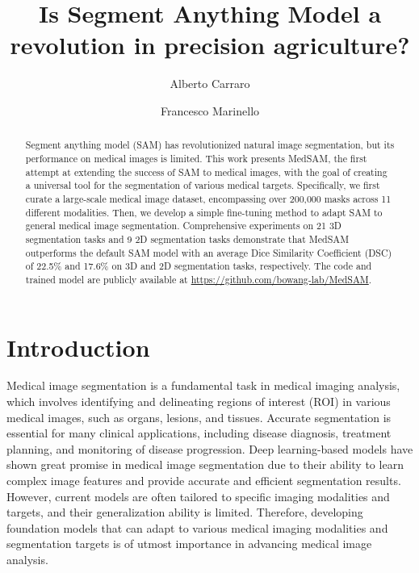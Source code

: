 \documentclass[runningheads]{llncs}
\begin{document}
%
\title{Is Segment Anything Model a revolution in precision agriculture?}
%
%

\author{
Alberto Carraro
\and
Francesco Marinello
}
%
%
\maketitle              %
%
\begin{abstract}
Segment anything model (SAM) has revolutionized natural image segmentation, but its performance on medical images is limited. 
This work presents MedSAM, the first attempt at  extending the success of SAM to medical images, with the goal of creating a universal tool for the segmentation of various medical targets. 
Specifically, we first curate a large-scale medical image dataset, encompassing over 200,000 masks across 11 different modalities. Then, we develop a simple fine-tuning method to adapt SAM to general medical image segmentation. Comprehensive experiments on 21 3D segmentation tasks and 9 2D segmentation tasks demonstrate that MedSAM outperforms the default SAM model with an average Dice Similarity Coefficient (DSC) of 22.5\% and 17.6\% on 3D and 2D segmentation tasks, respectively.
The code and trained model are publicly available at \url{https://github.com/bowang-lab/MedSAM}.
\end{abstract}



\section{Introduction}
Medical image segmentation is a fundamental task in medical imaging analysis, which involves identifying and delineating regions of interest (ROI) in various medical images, such as organs, lesions, and tissues. Accurate segmentation is essential for many clinical applications, including disease diagnosis, treatment planning, and monitoring of disease progression. Deep learning-based models have shown great promise in medical image segmentation due to their ability to learn complex image features and provide accurate and efficient segmentation results. However, current models are often tailored to specific imaging modalities and targets, and their generalization ability is limited. Therefore, developing foundation models that can adapt to various medical imaging modalities and segmentation targets is of utmost importance in advancing medical image analysis.
\end{document}
